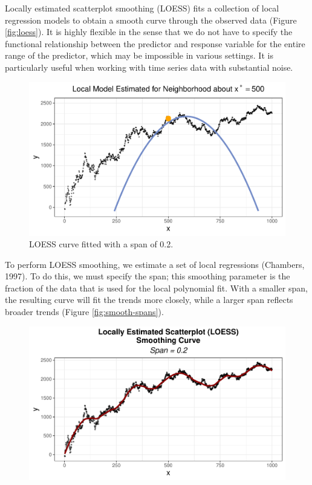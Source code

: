 \documentclass[12pt,twoside]{smiththesis}
\begin{document}
Locally estimated scatterplot smoothing (LOESS) fits a collection of local regression models to obtain a smooth curve through the observed data (Figure \ref{fig:loess}). It is highly flexible in the sense that we do not have to specify the functional relationship between the predictor and response variable for the entire range of the predictor, which may be impossible in various settings. It is particularly useful when working with time series data with substantial noise.
\begin{figure}

{\centering \includegraphics[width=1\linewidth]{thesis_files/figure-latex/unnamed-chunk-23-1} 

}

\caption{\label{fig:loess}LOESS curve fitted with  a span of 0.2. }\label{fig:unnamed-chunk-23}
\end{figure}
To perform LOESS smoothing, we estimate a set of local regressions (Chambers, 1997). To do this, we must specify the span; this smoothing parameter is the fraction of the data that is used for the local polynomial fit. With a smaller span, the resulting curve will fit the trends more closely, while a larger span reflects broader trends (Figure \ref{fig:smooth-spans}).
\begin{figure}

{\centering \includegraphics[width=1\linewidth]{thesis_files/figure-latex/unnamed-chunk-24-1} 

}

\caption{\label{fig:smooth-spans}}\label{fig:unnamed-chunk-24}
\end{figure}
\end{document}
